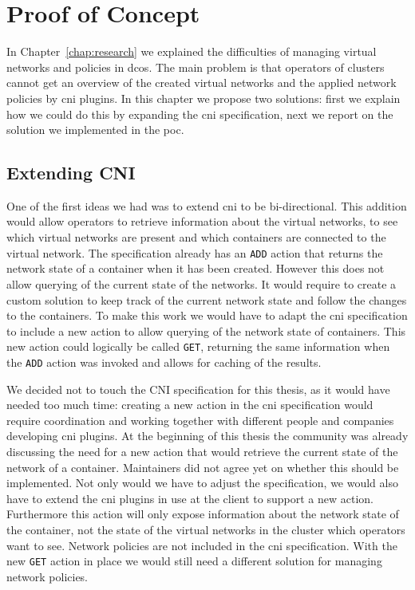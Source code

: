 \chapter{Proof of Concept}
\label{chap:proof-of-concept}
In Chapter~\ref{chap:research} we explained the difficulties of managing virtual networks and policies in \gls{dcos}. The main problem is that operators of clusters cannot get an overview of the created virtual networks and the applied network policies by \gls{cni} plugins. In this chapter we propose two solutions: first we explain how we could do this by expanding the \gls{cni} specification, next we report on the solution we implemented in the \gls{poc}. 

\section{Extending CNI}
\label{sec:expanding-cni}
One of the first ideas we had was to extend \gls{cni} to be bi-directional. This addition would allow operators to retrieve information about the virtual networks, to see which virtual networks are present and which containers are connected to the virtual network. The specification already has an \texttt{ADD} action that returns the network state of a container when it has been created. However this does not allow querying of the current state of the networks. It would require to create a custom solution to keep track of the current network state and follow the changes to the containers. To make this work we would have to adapt the \gls{cni} specification to include a new action to allow querying of the network state of containers. This new action could logically be called \texttt{GET}, returning the same information when the \texttt{ADD} action was invoked and allows for caching of the results.

We decided not to touch the CNI specification for this thesis, as it would have needed too much time: creating a new action in the \gls{cni} specification would require coordination and working together with different people and companies developing \gls{cni} plugins. At the beginning of this thesis the community was already discussing the need for a new action that would retrieve the current state of the network of a container. Maintainers did not agree yet on whether this should be implemented. Not only would we have to adjust the specification, we would also have to extend the \gls{cni} plugins in use at the client to support a new action. Furthermore this action will only expose information about the network state of the container, not the state of the virtual networks in the cluster which operators want to see. Network policies are not included in the \gls{cni} specification. With the new \texttt{GET} action in place we would still need a different solution for managing network policies. 

